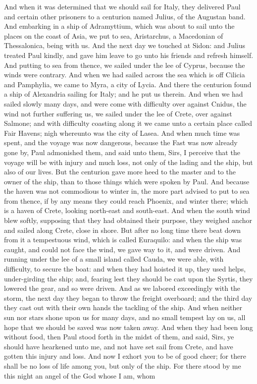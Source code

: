 And when it was determined that we should sail for Italy, they delivered Paul and certain other prisoners to a centurion named Julius, of the Augustan band. And embarking in a ship of Adramyttium, which was about to sail unto the places on the coast of Asia, we put to sea, Aristarchus, a Macedonian of Thessalonica, being with us. And the next day we touched at Sidon: and Julius treated Paul kindly, and gave him leave to go unto his friends and refresh himself. And putting to sea from thence, we sailed under the lee of Cyprus, because the winds were contrary. And when we had sailed across the sea which is off Cilicia and Pamphylia, we came to Myra, a city of Lycia. And there the centurion found a ship of Alexandria sailing for Italy; and he put us therein. And when we had sailed slowly many days, and were come with difficulty over against Cnidus, the wind not further suffering us, we sailed under the lee of Crete, over against Salmone; and with difficulty coasting along it we came unto a certain place called Fair Havens; nigh whereunto was the city of Lasea.  And when much time was spent, and the voyage was now dangerous, because the Fast was now already gone by, Paul admonished them, and said unto them, Sirs, I perceive that the voyage will be with injury and much loss, not only of the lading and the ship, but also of our lives. But the centurion gave more heed to the master and to the owner of the ship, than to those things which were spoken by Paul. And because the haven was not commodious to winter in, the more part advised to put to sea from thence, if by any means they could reach Phoenix, and winter there; which is a haven of Crete, looking north-east and south-east. And when the south wind blew softly, supposing that they had obtained their purpose, they weighed anchor and sailed along Crete, close in shore. But after no long time there beat down from it a tempestuous wind, which is called Euraquilo: and when the ship was caught, and could not face the wind, we gave way to it, and were driven. And running under the lee of a small island called Cauda, we were able, with difficulty, to secure the boat: and when they had hoisted it up, they used helps, under-girding the ship; and, fearing lest they should be cast upon the Syrtis, they lowered the gear, and so were driven. And as we labored exceedingly with the storm, the next day they began to throw the freight overboard; and the third day they cast out with their own hands the tackling of the ship. And when neither sun nor stars shone upon us for many days, and no small tempest lay on us, all hope that we should be saved was now taken away. And when they had been long without food, then Paul stood forth in the midst of them, and said, Sirs, ye should have hearkened unto me, and not have set sail from Crete, and have gotten this injury and loss. And now I exhort you to be of good cheer; for there shall be no loss of life among you, but only of the ship. For there stood by me this night an angel of the God whose I am, whom 